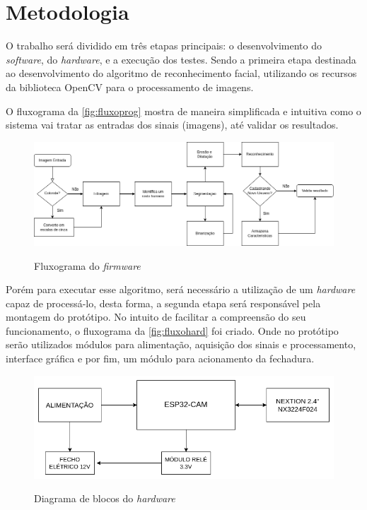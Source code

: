 
\chapter{Metodologia}\label{cap:materialemetodos}

O trabalho será dividido em três etapas principais: o desenvolvimento do \textit{software}, 
do \textit{hardware}, e a execução dos testes. Sendo a primeira etapa 
destinada ao desenvolvimento do algoritmo de reconhecimento facial, utilizando os 
recursos da biblioteca OpenCV para o processamento de imagens.

O fluxograma da \autoref{fig:fluxoprog} mostra de maneira simplificada e intuitiva
como o sistema vai tratar as entradas dos sinais (imagens), até validar os resultados.

\begin{figure}[h!]
    \centering
    \caption{Fluxograma do \textit{firmware}}
    \includegraphics[scale=0.4]{figuras/fluxo_programa.png} 
    \fonte{}%
    \label{fig:fluxoprog}
    \centering
\end{figure}

Porém para executar esse algoritmo, será necessário a utilização de um \textit{hardware} 
capaz de processá-lo, desta forma, a segunda etapa será responsável pela montagem 
do protótipo. No intuito de facilitar a compreensão do seu funcionamento, o fluxograma da 
\autoref{fig:fluxohard} foi criado. Onde no protótipo serão utilizados módulos para alimentação, 
aquisição dos sinais e processamento, interface gráfica e por fim, um módulo para 
acionamento da fechadura.

\begin{figure}[h!]
    \centering
    \caption{Diagrama de blocos do \textit{hardware}}
    \includegraphics[scale=0.4]{figuras/fluxo_hardware.png} 
    \fonte{}%
    \label{fig:fluxohard}
    \centering
\end{figure}

